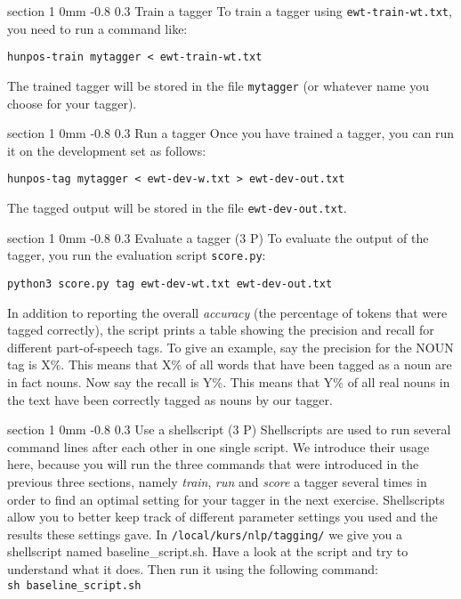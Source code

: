 \documentclass[11pt]{article}
\makeatletter
\newcommand{\newsec}[2]{\section{#1}\label{sec:#2}\noindent}
\renewcommand{\section}{\@startsection
{section}%
{1}%
{0mm}%
{-0.8\baselineskip}%
{0.3\baselineskip}%
{\bfseries\large}}%
\makeatother
\begin{document}
        \newsec{Train a tagger}{train}%
        To train a tagger using {\tt ewt-train-wt.txt}, you need to
        run a command like:
\begin{verbatim}
hunpos-train mytagger < ewt-train-wt.txt
\end{verbatim}
The trained tagger will be stored in the file {\tt mytagger} (or
whatever name you choose for your tagger).

\newsec{Run a tagger}{run}%
Once you have trained a tagger, you can run it on the development set
as follows:
\begin{verbatim}
hunpos-tag mytagger < ewt-dev-w.txt > ewt-dev-out.txt
\end{verbatim}
The tagged output will be stored in the file {\tt ewt-dev-out.txt}.

\newsec{Evaluate a tagger (3 P)}{eval}%
To evaluate the output of the tagger, you run the evaluation script {\tt score.py}:
\begin{verbatim}
python3 score.py tag ewt-dev-wt.txt ewt-dev-out.txt
\end{verbatim}
In addition to reporting the overall \emph{accuracy} (the percentage
of tokens that were tagged correctly), the script prints a table
showing the precision and recall for different part-of-speech tags. To
give an example, say the precision for the NOUN tag is X\%. This means
that X\% of all words that have been tagged as a noun are in fact
nouns. Now say the recall is Y\%. This means that Y\% of all real
nouns in the text have been correctly tagged as nouns by our tagger.

\newsec{Use a shellscript (3 P)}{shell}%
Shellscripts are used to run several command lines after each other in one single script. We introduce their usage here, because you will run the three commands that were introduced in the previous three sections, namely \emph{train}, \emph{run} and \emph{score} a tagger several times in order to find an optimal setting for your tagger in the next exercise. Shellscripts allow you to better keep track of different parameter settings you used and the results these settings gave. In \texttt{/local/kurs/nlp/tagging/} we give you a shellscript named baseline\_script.sh. Have a look at the script and try to understand what it does. Then run it using the following command:\\
\texttt{sh baseline\_script.sh}
%
%
%
%
%
%
\end{document}
